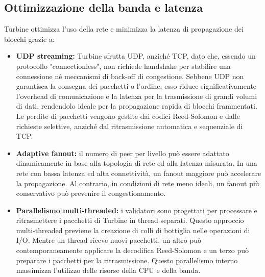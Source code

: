 \documentclass[a4paper,12pt]{report}
\begin{document}
	\subsection{Ottimizzazione della banda e latenza}
	Turbine ottimizza l’uso della rete e minimizza la latenza di propagazione dei blocchi grazie a:  
	\begin{itemize}
		\item \textbf{UDP streaming:} Turbine sfrutta UDP, anziché TCP, dato che, essendo un protocollo "connectionless", non richiede handshake per stabilire una connessione né meccanismi di back-off di congestione. Sebbene UDP non garantisca la consegna dei pacchetti o l'ordine, esso riduce significativamente l'overhead di comunicazione e la latenza per la trasmissione di grandi volumi di dati, rendendolo ideale per la propagazione rapida di blocchi frammentati. Le perdite di pacchetti vengono gestite dai codici Reed-Solomon e dalle richieste selettive, anziché dal ritrasmissione automatica e sequenziale di TCP.
		\item \textbf{Adaptive fanout:} il numero di peer per livello può essere adattato dinamicamente in base alla topologia di rete ed alla latenza misurata. In una rete con bassa latenza ed alta connettività, un fanout maggiore può accelerare la propagazione. Al contrario, in condizioni di rete meno ideali, un fanout più conservativo può prevenire il congestionamento. 
		\item \textbf{Parallelismo multi-threaded:} i validatori sono progettati per processare e ritrasmettere i pacchetti di Turbine in thread separati. Questo approccio multi-threaded previene la creazione di colli di bottiglia nelle operazioni di I/O. Mentre un thread riceve nuovi pacchetti, un altro può contemporaneamente applicare la decodifica Reed-Solomon e un terzo può preparare i pacchetti per la ritrasmissione. Questo parallelismo interno massimizza l'utilizzo delle risorse della CPU e della banda.
	\end{itemize}
	
\end{document}

